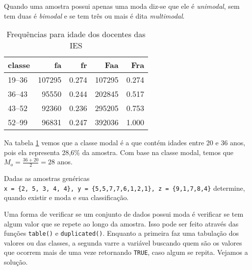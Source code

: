 \documentclass[12pt,]{style/krantz}
\makeatletter
\newenvironment{Shaded}{\begin{snugshade}}{\end{snugshade}}
\newcommand{\KeywordTok}[1]{\textcolor[rgb]{0.13,0.29,0.53}{\textbf{#1}}}
\newcommand{\DataTypeTok}[1]{\textcolor[rgb]{0.13,0.29,0.53}{#1}}
\newcommand{\DecValTok}[1]{\textcolor[rgb]{0.00,0.00,0.81}{#1}}
\newcommand{\StringTok}[1]{\textcolor[rgb]{0.31,0.60,0.02}{#1}}
\newcommand{\OtherTok}[1]{\textcolor[rgb]{0.56,0.35,0.01}{#1}}
\newcommand{\OperatorTok}[1]{\textcolor[rgb]{0.81,0.36,0.00}{\textbf{#1}}}
\newcommand{\NormalTok}[1]{#1}
\newenvironment{kframe}{%
\medskip{}
\setlength{\fboxsep}{.8em}
 \def\at@end@of@kframe{}%
 \ifinner\ifhmode%
  \def\at@end@of@kframe{\end{minipage}}%
  \begin{minipage}{\columnwidth}%
 \fi\fi%
 \def\FrameCommand##1{\hskip\@totalleftmargin \hskip-\fboxsep
 \colorbox{shadecolor}{##1}\hskip-\fboxsep
     \hskip-\linewidth \hskip-\@totalleftmargin \hskip\columnwidth}%
 \MakeFramed {\advance\hsize-\width
   \@totalleftmargin\z@ \linewidth\hsize
   \@setminipage}}%
 {\par\unskip\endMakeFramed%
 \at@end@of@kframe}
\renewenvironment{Shaded}{\begin{kframe}}{\end{kframe}}
\theoremstyle{definition}
\theoremstyle{definition}
\theoremstyle{definition}
\theoremstyle{remark}
\let\BeginKnitrBlock\begin \let\EndKnitrBlock\end
\makeatother
\begin{document}
Quando uma amostra possui apenas uma moda diz-se que ele é
\emph{unimodal}, sem tem duas é \emph{bimodal} e se tem três ou mais é
dita \emph{multimodal}.

\begin{Shaded}
\end{Shaded}

\begin{table}[!h]

\caption{\label{tab:tab08}Frequências para idade dos docentes das IES}
\centering
\begin{tabular}{lrrrr}
\toprule
classe & fa & fr & Faa & Fra\\
\midrule
19--36 & 107295 & 0.274 & 107295 & 0.274\\
36--43 & 95550 & 0.244 & 202845 & 0.517\\
43--52 & 92360 & 0.236 & 295205 & 0.753\\
52--99 & 96831 & 0.247 & 392036 & 1.000\\
\bottomrule
\end{tabular}
\end{table}

Na tabela \ref{tab:tab08} vemos que a classe modal é a que contém idades
entre 20 e 36 anos, pois ela representa 28,6\% da amostra. Com base na
classe modal, temos que \(M_o = \frac{36+20}{2} = 28\) anos.

\BeginKnitrBlock{example}
\protect\hypertarget{exm:unnamed-chunk-56}{}{\label{exm:unnamed-chunk-56}
}Dadas as amostras genéricas
\texttt{x\ =\ \{2,\ 5,\ 3,\ 4,\ 4\},\ y\ =\ \{5,5,7,7,6,1,2,1\},\ z\ =\ \{9,1,7,8,4\}}
determine, quando existir e moda e sua classificação.
\EndKnitrBlock{example}

Uma forma de verificar se um conjunto de dados possui moda é verificar
se tem algum valor que se repete ao longo da amostra. Isso pode ser
feito através das funções \texttt{table()} e \texttt{duplicated()}.
Enquanto a primeira faz uma tabulação dos valores ou das classes, a
segunda varre a variável buscando quem são os valores que ocorrem mais
de uma veze retornando \texttt{TRUE}, caso algum se repita. Vejamos a
solução.
\end{document}
